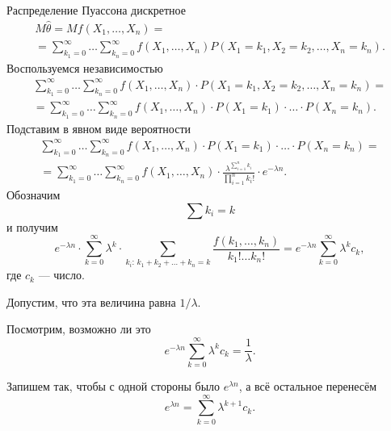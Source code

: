 Распределение Пуассона дискретное
\begin{equation*}
  \begin{split}
    M \hat{ \theta } =
    Mf \left( X_1, \dotsc, X_n \right) = \\
    = \sum \limits_{k_1 = 0}^{ \infty } \dotsc \sum \limits_{k_n = 0}^{ \infty }
      f \left( X_1, \dotsc, X_n \right) P \left( X_1 = k_1, X_2 = k_2, \dotsc, X_n = k_n \right).
  \end{split}
\end{equation*}
Воспользуемся независимостью
\begin{equation*}
  \begin{split}
    \sum \limits_{k_1 = 0}^{ \infty } \dotsc \sum \limits_{k_n = 0}^{ \infty }
      f \left( X_1, \dotsc, X_n \right) \cdot
      P \left( X_1 = k_1, X_2 = k_2, \dotsc, X_n = k_n \right) = \\
    = \sum \limits_{k_1 = 0}^{ \infty } \dotsc \sum \limits_{k_n = 0}^{ \infty }
      f \left( X_1, \dotsc, X_n \right) \cdot
      P \left( X_1 = k_1 \right) \cdot \dotsc \cdot P \left( X_n = k_n \right).
  \end{split}
\end{equation*}
Подставим в явном виде вероятности
\begin{equation*}
  \begin{split}
    \sum \limits_{k_1 = 0}^{ \infty } \dotsc \sum \limits_{k_n = 0}^{ \infty }
      f \left( X_1, \dotsc, X_n \right) \cdot
      P \left( X_1 = k_1 \right) \cdot \dotsc \cdot P \left( X_n = k_n \right) = \\
    = \sum \limits_{k_1 = 0}^{ \infty } \dotsc \sum \limits_{k_n = 0}^{ \infty }
      f \left( X_1, \dotsc, X_n \right) \cdot
      \frac{ \lambda^{ \sum \limits_{i = 1}^n k_i}}{ \prod \limits_{i = 1}^n k_i!} \cdot
      e^{- \lambda n}.
  \end{split}
\end{equation*}
Обозначим
$$ \sum k_i =
  k$$
и получим
$$e^{- \lambda n} \cdot
  \sum \limits_{k = 0}^{ \infty } \lambda^k \cdot
  \sum \limits_{k_i: \, k_1 + k_2 + \dotsc + k_n = k}
    \frac{f \left( k_1, \dotsc, k_n \right) }{k_1! \dotsc k_n!} =
  e^{- \lambda n} \sum \limits_{k = 0}^{ \infty } \lambda^k c_k,$$
где $c_k$ --- число.

Допустим, что эта величина равна $1 / \lambda $.

Посмотрим, возможно ли это
$$e^{- \lambda n} \sum \limits_{k = 0}^{ \infty } \lambda^k c_k =
  \frac{1}{ \lambda }.$$

Запишем так, чтобы с одной стороны было $e^{ \lambda n}$, а всё остальное перенесём
$$e^{ \lambda n} =
  \sum \limits_{k = 0}^{ \infty } \lambda^{k + 1} c_k.$$


